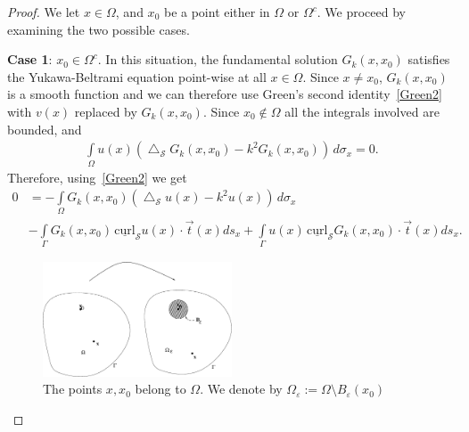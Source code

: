 \documentclass[final]{siamltex}
\newcommand{\lap}{\bigtriangleup}
\renewcommand{\S} {\mathcal{S}}
\begin{document}
\begin{proof} We let $x\in \Omega$, and $x_0$ be a point either in $\Omega$ or $\Omega^c$. 
We proceed by examining the two possible cases.

{\bf Case 1}:  $x_{0} \in \Omega^{c}$.  In this situation, the
fundamental solution $G_{k}(x,x_{0})$ satisfies the Yukawa-Beltrami
equation point-wise at all $x\in \Omega$. Since $x \neq x_0$,
$G_{k}(x,x_0)$ is a smooth function and we can therefore use Green's
second identity~\eqref{Green2} with $v(x)$ replaced by
$G_{k}(x,x_{0})$. Since $x_0\not \in \Omega$ all the
integrals involved are bounded, and 
\begin{align*}
  \int\limits_{\Omega} u(x)(\lap_{\S}G_{k}(x,x_0) 
      -k^{2}G_{k}(x,x_0)) \, d\sigma_x=0.
\end{align*}
Therefore, using~\eqref{Green2} we get 
\begin{align*}
 0 &= - \int\limits_{\Omega}
    G_k(x,x_{0})\left(\lap_{\S}u(x) -k^2 u(x)\right)\,d\sigma_x \\
    &-\int\limits_{{\Gamma}} G_k(x,x_{0}) \, \underline{\mbox{curl}}_{\S}
    u(x) \cdot \vec{t}(x) ds_{x} 
 + \int\limits_{{\Gamma}}  u(x)
 \,\underline{\mbox{curl}}_{{\S}} G_k(x,x_0) \cdot \vec{t}(x) ds_{x}.
\end{align*}
\begin{figure}
  \centering
  \includegraphics[width=0.5\textwidth]{proof1}
  \caption{\label{f:proof1} The points $x,x_0$ belong to $\Omega$. We
  denote by $\Omega_\varepsilon:=\Omega\setminus B_{\varepsilon}(x_0)$}
\end{figure}


\end{proof}
\end{document}
